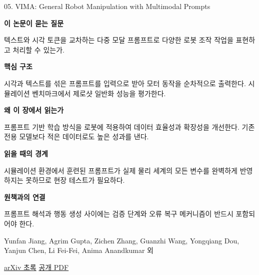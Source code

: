 \documentclass[11pt,openany]{book}
\begin{document}
\begin{termcard}{05. VIMA: General Robot Manipulation with Multimodal Prompts}

\par

\medskip

{\sffamily\bfseries\color{deepblue} 이 논문이 묻는 질문}\par

텍스트와 시각 토큰을 교차하는 다중 모달 프롬프트로 다양한 로봇 조작 작업을 표현하고 처리할 수 있는가.

\smallskip

{\sffamily\bfseries\color{deepblue} 핵심 구조}\par

시각과 텍스트를 섞은 프롬프트를 입력으로 받아 모터 동작을 순차적으로 출력한다. 시뮬레이션 벤치마크에서 제로샷 일반화 성능을 평가한다.

\smallskip

{\sffamily\bfseries\color{deepblue} 왜 이 장에서 읽는가}\par

프롬프트 기반 학습 방식을 로봇에 적용하여 데이터 효율성과 확장성을 개선한다. 기존 전용 모델보다 적은 데이터로도 높은 성과를 낸다.

\smallskip

{\sffamily\bfseries\color{coral} 읽을 때의 경계}\par

시뮬레이션 환경에서 훈련된 프롬프트가 실제 물리 세계의 모든 변수를 완벽하게 반영하지는 못하므로 현장 테스트가 필요하다.

\smallskip

{\sffamily\bfseries\color{teal} 원책과의 연결}\par

프롬프트 해석과 행동 생성 사이에는 검증 단계와 오류 복구 메커니즘이 반드시 포함되어야 한다.

\medskip

{\footnotesize\color{muted} Yunfan Jiang, Agrim Gupta, Zichen Zhang, Guanzhi Wang, Yongqiang Dou, Yanjun Chen, Li Fei-Fei, Anima Anandkumar 외\par

\href{https://arxiv.org/abs/2210.03094}{arXiv 초록} \quad \href{https://arxiv.org/pdf/2210.03094}{공개 PDF}\par}

\end{termcard}
\end{document}
